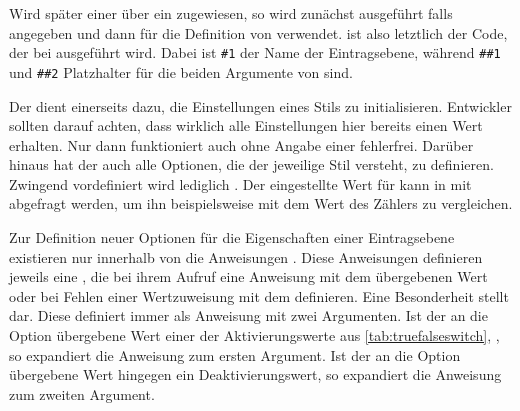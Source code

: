 Wird später einer  über
 ein  zugewiesen, so
wird zunächst  ausgeführt falls angegeben und dann
 für die Definition von 
verwendet.  ist also letztlich der Code, der bei
 ausgeführt wird. Dabei ist \texttt{\#1} der
Name der Eintragsebene, während \texttt{\#\#1} und \texttt{\#\#2} Platzhalter
für die beiden Argumente von  sind.

Der  dient einerseits dazu, die Einstellungen
eines Stils zu initialisieren. Entwickler sollten darauf
achten, dass wirklich alle Einstellungen hier bereits einen Wert erhalten. Nur
dann funktioniert  auch ohne
Angabe einer  fehlerfrei. Darüber hinaus hat der
 auch alle Optionen, die der jeweilige Stil
versteht, zu definieren. Zwingend vordefiniert wird lediglich
. Der eingestellte Wert für  kann in
 mit %
 abgefragt werden, um ihn
beispielsweise mit dem Wert des Zählers
 zu vergleichen.

Zur Definition neuer Optionen für die Eigenschaften einer
Eintragsebene existieren nur innerhalb von  die
Anweisungen .
Diese Anweisungen definieren jeweils eine , die bei ihrem
Aufruf eine Anweisung
 mit dem übergebenen
Wert oder bei Fehlen einer Wertzuweisung mit dem 
definieren. Eine Besonderheit stellt  dar. Diese
definiert  immer als
Anweisung mit zwei Argumenten. Ist der an die Option übergebene Wert einer der
Aktivierungswerte aus \autoref{tab:truefalseswitch},
, so expandiert die Anweisung zum ersten
Argument. Ist der an die Option übergebene Wert hingegen ein
Deaktivierungswert, so expandiert die Anweisung zum zweiten Argument.

